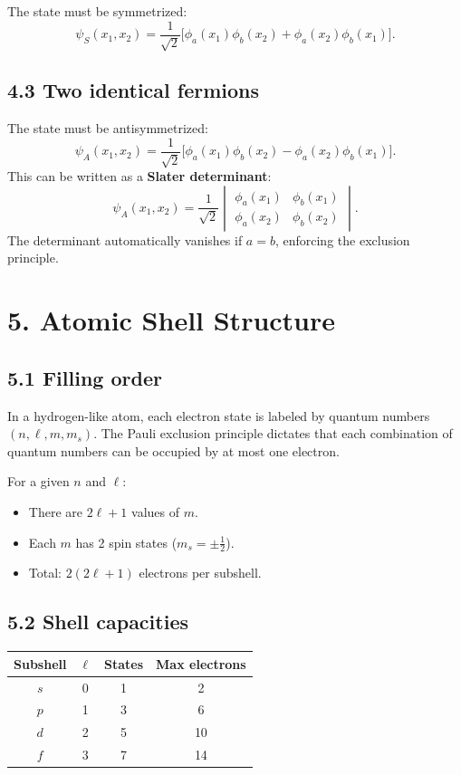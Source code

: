 \documentclass[12pt,a4paper]{article}
\begin{document}
The state must be symmetrized:
\[
    \psi_S(x_1, x_2) = \frac{1}{\sqrt{2}}\bigl[\phi_a(x_1)\phi_b(x_2) + \phi_a(x_2)\phi_b(x_1)\bigr].
\]

\subsection{4.3 Two identical fermions}

The state must be antisymmetrized:
\[
    \psi_A(x_1, x_2) = \frac{1}{\sqrt{2}}\bigl[\phi_a(x_1)\phi_b(x_2) - \phi_a(x_2)\phi_b(x_1)\bigr].
\]
This can be written as a \textbf{Slater determinant}:
\[
    \psi_A(x_1, x_2) = \frac{1}{\sqrt{2}}\begin{vmatrix} \phi_a(x_1) & \phi_b(x_1) \\ \phi_a(x_2) & \phi_b(x_2) \end{vmatrix}.
\]
The determinant automatically vanishes if $a = b$, enforcing the exclusion principle.

\section{5. Atomic Shell Structure}

\subsection{5.1 Filling order}

In a hydrogen-like atom, each electron state is labeled by quantum numbers $(n, \ell, m, m_s)$.  The Pauli exclusion principle dictates that each combination of quantum numbers can be occupied by at most one electron.

For a given $n$ and $\ell$:
\begin{itemize}[nosep]
    \item There are $2\ell + 1$ values of $m$.
    \item Each $m$ has 2 spin states ($m_s = \pm\frac{1}{2}$).
    \item Total: $2(2\ell + 1)$ electrons per subshell.
\end{itemize}

\subsection{5.2 Shell capacities}

\begin{center}
\begin{tabular}{c c c c}
\textbf{Subshell} & $\ell$ & \textbf{States} & \textbf{Max electrons} \\
\hline
$s$ & 0 & 1 & 2 \\
$p$ & 1 & 3 & 6 \\
$d$ & 2 & 5 & 10 \\
$f$ & 3 & 7 & 14 \\
\end{tabular}
\end{center}
\end{document}
